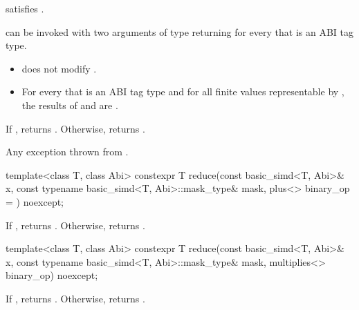 \begin{itemdescr}
  \pnum\constraints
   satisfies .

  \pnum\mandates
   can be invoked with two arguments of type  returning  for every  that is an ABI tag type.

  \pnum\expects
  \begin{itemize}
    \item {} does not modify .

    \item For every  that is an ABI tag type and for all finite
      values  representable by , the results of
       and  are .
  \end{itemize}

  \pnum\returns
  If , returns .
  Otherwise, returns  \forallmaskedi.

  \pnum\throws
  Any exception thrown from .
\end{itemdescr}

\begin{itemdecl}
template<class T, class Abi>
  constexpr T reduce(const basic_simd<T, Abi>& x, const typename basic_simd<T, Abi>::mask_type& mask,
                     plus<> binary_op = {}) noexcept;
\end{itemdecl}

\begin{itemdescr}
  \pnum\returns
  If , returns . Otherwise, returns  \forallmaskedi.
\end{itemdescr}

\begin{itemdecl}
template<class T, class Abi>
  constexpr T reduce(const basic_simd<T, Abi>& x, const typename basic_simd<T, Abi>::mask_type& mask,
                     multiplies<> binary_op) noexcept;
\end{itemdecl}

\begin{itemdescr}
  \pnum\returns
  If , returns . Otherwise, returns  \forallmaskedi.
\end{itemdescr}

